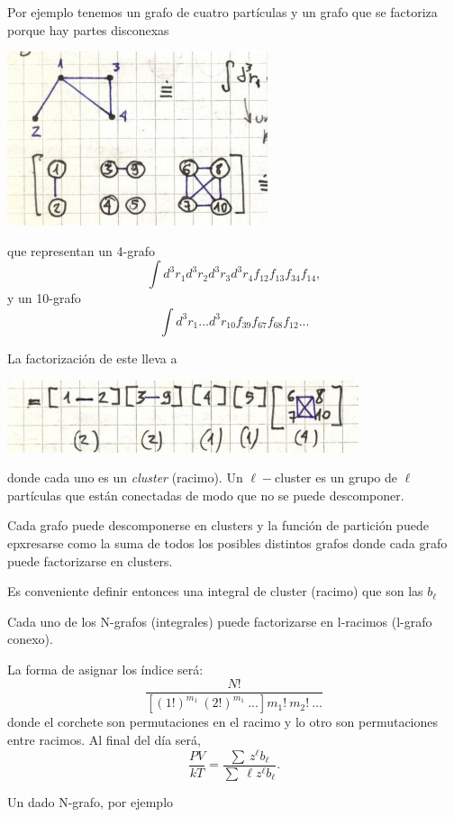 \documentclass[10pt,oneside]{CBFT_book}
\begin{document}
Por ejemplo tenemos un grafo de cuatro partículas y un grafo que se factoriza porque hay partes
disconexas

\includegraphics[scale=0.4]{images/1606337071.jpg}

que representan un 4-grafo
\[
	\int d^3r_1  d^3r_2 d^3r_3 d^3r_4 f_{12} f_{13} f_{34} f_{14},
\]
y un 10-grafo
\[
	\int d^3r_1 ... d^3r_{10} f_{39} f_{67} f_{68} f_{12} ...
\]

La factorización de este lleva a 

\includegraphics[scale=0.4]{images/1606337077.jpg}

donde cada uno es un {\it cluster} (racimo). Un $\ell-$cluster es un grupo de $\ell$ partículas que están
conectadas de modo que no se puede descomponer.

Cada grafo puede descomponerse en clusters y la función de partición puede epxresarse como la suma
de todos los posibles distintos grafos donde cada grafo puede factorizarse en clusters.

Es conveniente definir entonces una integral de cluster (racimo) que son las $b_\ell$



Cada uno de los N-grafos (integrales) puede factorizarse en l-racimos (l-grafo conexo).

La forma de asignar los índice será:
\[
	\frac{ N! }{[ (1!)^{m_1} \: (2!)^{m_1} \: ... ] m_1! \: m_2! \: ...}
\]
donde el corchete son permutaciones en el racimo y lo otro son permutaciones entre racimos.
Al final del día será,
\[
	\frac{PV}{kT} = \frac{ \sum \: z^\ell b_\ell }{ \sum \: \ell z^\ell b_\ell  }.
\]

Un dado N-grafo, por ejemplo
\end{document}
